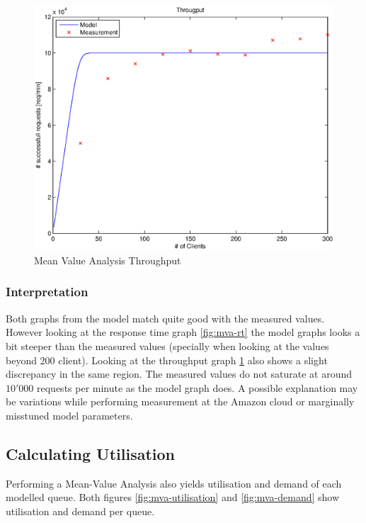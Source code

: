 \documentclass[a4paper]{article}
\begin{document}
\begin{figure}[H]
	\begin{center}
    \includegraphics[scale=0.6]{../plots-ms2-mg/mva-tp.eps}
  \end{center}
  \caption{Mean Value Analysis Throughput}
  \label{fig:mva-tp}
\end{figure}



\subsubsection{Interpretation}
Both graphs from the model match quite good with the measured values. However looking at the response time graph \ref{fig:mva-rt} the model graphs looks a bit steeper than the measured values (specially when looking at the values beyond 200 client). Looking at the throughput graph \ref{fig:mva-tp} also shows a slight discrepancy in the same region. The measured values do not saturate at around $10'000$ requests per minute as the model graph does. A possible explanation may be variations while performing measurement at the Amazon cloud or marginally misstuned model parameters.


\subsection{Calculating Utilisation}

Performing a Mean-Value Analysis also yields utilisation and demand of each modelled queue. Both figures \ref{fig:mva-utilisation} and \ref{fig:mva-demand} show utilisation and demand per queue.
\end{document}
